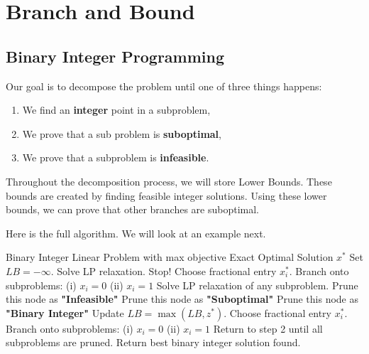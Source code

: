 \section{Branch and Bound}
\label{sec:branch-and-bound}
\subsection{Binary Integer Programming}
Our goal is to decompose the problem until one of three things happens:
\begin{enumerate}
\item We find an \textbf{integer} point in a subproblem,
\item We prove that a sub problem is \textbf{suboptimal},
\item We prove that a subproblem is \textbf{infeasible}.
\end{enumerate}
Throughout the decomposition process, we will store Lower Bounds.  These bounds are created by finding feasible integer solutions.  Using these lower bounds, we can prove that other branches are suboptimal.

Here is the full algorithm.  We will look at an example next.
\begin{algorithm}[H]
\caption{Branch and Bound for Binary Integer Programming}\label{alg:branch-and-bound-bip}
\begin{algorithmic}[1]
    \Require Binary Integer Linear Problem with max objective
    \Ensure Exact Optimal Solution $x^*$
    \State Set $LB = - \infty$.
    \State Solve LP relaxation. 
        \State Stop!
    \Else
        \State Choose fractional entry $x_i^*$.
        \State Branch onto subproblems:
        \Statex \hspace{2em} (i) $x_i = 0$
        \Statex \hspace{2em} (ii) $x_i = 1$
    \EndIf
    \State Solve LP relaxation of any subproblem.
        \State Prune this node as \textbf{"Infeasible"}
        \State Prune this node as \textbf{"Suboptimal"}
        \State Prune this node as \textbf{"Binary Integer"}
        \State Update $LB = \max(LB, z^*)$.
    \Else
        \State Choose fractional entry $x_i^*$.
        \State Branch onto subproblems:
        \Statex \hspace{2em} (i) $x_i = 0$
        \Statex \hspace{2em} (ii) $x_i = 1$
        \State Return to step 2 until all subproblems are pruned.
    \EndIf
    \State Return best binary integer solution found.
\end{algorithmic}
\end{algorithm}

